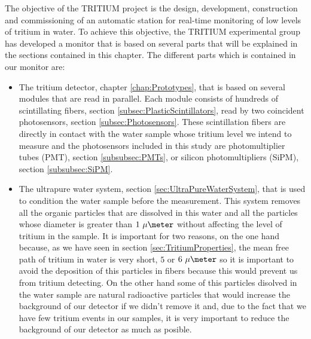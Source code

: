 The objective of the TRITIUM project is the design, development, construction and commissioning of an automatic station for real-time monitoring of low levels of tritium in water. To achieve this objective, the TRITIUM experimental group has developed a monitor that is based on several parts that will be explained in the sections contained in this chapter. The different parts which is contained in our monitor are:

\begin{itemize}

\item{} The tritium detector, chapter \ref{chap:Prototypes}, that is based on several modules that are read in parallel. Each module consists of hundreds of scintillating fibers, section \ref{subsec:PlasticScintillators}, read by two coincident photosensors, section \ref{subsec:Photosensors}. These scintillation fibers are directly in contact with the water sample whose tritium level we intend to measure and the photosensors included in this study are photomultiplier tubes (PMT), section \ref{subsubsec:PMTs}, or silicon photomultipliers (SiPM), section \ref{subsubsec:SiPM}.

\item{} The ultrapure water system, section \ref{sec:UltraPureWaterSystem}, that is used to condition the water sample before the measurement. This system removes all the organic particles that are dissolved in this water and all the particles whose diameter is greater than $1~\mu\meter$ without affecting the level of tritium in the sample. It is important for two reasons, on the one hand because, as we have seen in section \ref{sec:TritiumProperties}, the mean free path of tritium in water is very short, $5$ or $6~\mu\meter$  so it is important to avoid the deposition of this particles in fibers because this would prevent us from tritium detecting. On the other hand some of this particles disolved in the water sample are natural radioactive particles that would increase the background of our detector if we didn't remove it and, due to the fact that we have few tritium events in our samples, it is very important to reduce the background of our detector as much as posible.


\end{itemize}
